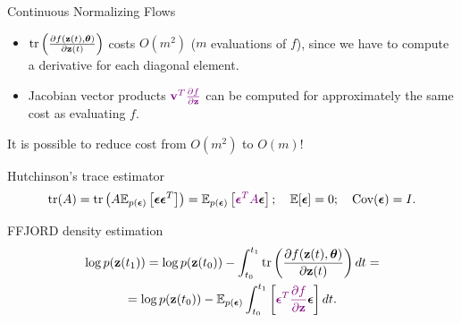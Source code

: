 \begin{frame}{Continuous Normalizing Flows}
	\vspace{0.2cm}
	\begin{itemize}
		\item $\text{tr} \left( \frac{\partial f(\mathbf{z}(t), \boldsymbol{\theta})}{\partial \mathbf{z}(t)} \right)$ costs $O(m^2)$ ($m$
		evaluations of $f$), since we have to compute a derivative for each diagonal element. 
		\item Jacobian vector products ${\color{violet}\mathbf{v}^T \frac{\partial f}{\partial \mathbf{z}}}$ can be computed for approximately the same cost as evaluating $f$.
	\end{itemize}
	It is possible to reduce cost from $O(m^2)$ to $O(m)$!
	\begin{block}{Hutchinson's trace estimator}
		\vspace{-0.3cm}
		\[
		    \text{tr}(A) = \text{tr}\left(A\mathbb{E}_{p(\boldsymbol{\epsilon})} \left[ \boldsymbol{\epsilon} \boldsymbol{\epsilon}^T \right]\right) = \mathbb{E}_{p(\boldsymbol{\epsilon})} \left[ {\color{violet} \boldsymbol{\epsilon}^T A} \boldsymbol{\epsilon}  \right]; \quad \mathbb{E} [\boldsymbol{\epsilon}] = 0; \quad \text{Cov} (\boldsymbol{\epsilon}) = I.
		\]
		\vspace{-0.5cm}
	\end{block}
	\begin{block}{FFJORD density estimation}
		\vspace{-0.8cm}
		\begin{multline*}
		    \log p(\mathbf{z}(t_1)) = \log p(\mathbf{z}(t_0)) - \int_{t_0}^{t_1} \text{tr}  \left( \frac{\partial f (\mathbf{z}(t), \boldsymbol{\theta})}{\partial \mathbf{z}(t)} \right) dt = \\ = \log p(\mathbf{z}(t_0)) - \mathbb{E}_{p(\boldsymbol{\epsilon})} \int_{t_0}^{t_1} \left[ {\color{violet}\boldsymbol{\epsilon}^T \frac{\partial f}{\partial \mathbf{z}}} \boldsymbol{\epsilon} \right] dt.
		\end{multline*}
	\end{block}
\end{frame}
